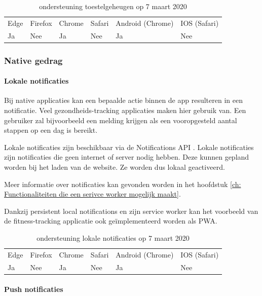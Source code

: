 \begin{table}[H]
	\centering
	\begin{tabular}{llllll}
		Edge & Firefox & Chrome & Safari & Android (Chrome) & IOS (Safari) \\
		Ja   & Nee      &  Ja     & Nee     & Ja               & Nee          
	\end{tabular}	
	\caption{ondersteuning toestelgeheugen op 7 maart 2020}
\end{table}



\subsubsection{Native gedrag}

\paragraph{Lokale notificaties}
Bij native applicaties kan een bepaalde actie binnen de app resulteren in een notificatie. Veel gezondheids-tracking applicaties maken hier gebruik van. Een gebruiker zal bijvoorbeeld een melding krijgen als een vooropgesteld aantal stappen op een dag is bereikt.

Lokale notificaties zijn beschikbaar via de Notifications API \autocite{Gregg2015}. Lokale notificaties zijn notificaties die geen internet of server nodig hebben. Deze kunnen gepland worden bij het laden van de website. Ze worden dus lokaal geactiveerd.

Meer informatie over notificaties kan gevonden worden in het hoofdstuk \ref{ch: Functionaliteiten die een serivce worker mogelijk maakt}.

Dankzij persistent local notifications en zijn service worker kan het voorbeeld van de fitness-tracking applicatie ook geïmplementeerd worden als PWA.

\begin{table}[H]
	\centering
	\begin{tabular}{llllll}
		Edge & Firefox & Chrome & Safari & Android (Chrome) & IOS (Safari) \\
		Ja   & Nee      &  Ja     & Nee     & Ja               & Nee          
	\end{tabular}	
	\caption{ondersteuning lokale notificaties op 7 maart 2020}
\end{table}

\paragraph{Push notificaties}

